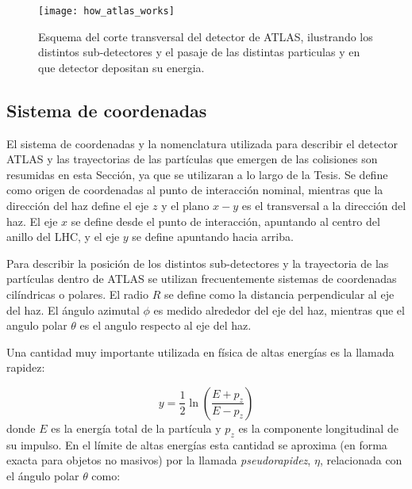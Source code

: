 \begin{figure}[!htbp]
  \centering

  \texttt{[image: how\_atlas\_works]}

  \caption{Esquema del corte transversal del detector de ATLAS, ilustrando los distintos
  sub-detectores y el pasaje de las distintas particulas y en que detector depositan su energia.}
  \label{fig:how_atlas_works}

\end{figure}

\subsection{Sistema de coordenadas}


El sistema de coordenadas y la nomenclatura utilizada para describir el detector
ATLAS y las trayectorias de las partículas que emergen de las colisiones son
resumidas en esta Sección, ya que se utilizaran a lo largo de la Tesis. Se
define como origen de coordenadas al punto de interacción nominal, mientras que
la dirección del haz define el eje $z$ y el plano $x-y$ es el transversal a la
dirección del haz. El eje $x$ se define desde el punto de interacción, apuntando
al centro del anillo del LHC, y el eje $y$ se define apuntando hacia arriba.

Para describir la posición de los distintos
sub-detectores y la trayectoria de las partículas dentro de ATLAS se utilizan
frecuentemente sistemas de coordenadas cilíndricas o polares. El radio $R$ se
define como la distancia perpendicular al eje del haz. El ángulo azimutal $\phi
$ es medido alrededor del eje del haz, mientras que el angulo polar $\theta$
es el angulo respecto al eje del haz.

Una cantidad muy importante utilizada en física de altas energías es la
llamada rapidez:

\begin{equation}
  y = \frac{1}{2} \ln \left( \frac{E+p_z}{E-p_z} \right)
\end{equation}
%
donde $E$ es la energía total de la partícula y $p_z$ es la componente
longitudinal de su impulso. En el límite de altas energías esta cantidad se
aproxima (en forma exacta para objetos no masivos) por la llamada
\emph{pseudorapidez}, $\eta$, relacionada con el ángulo polar $\theta$ como:

